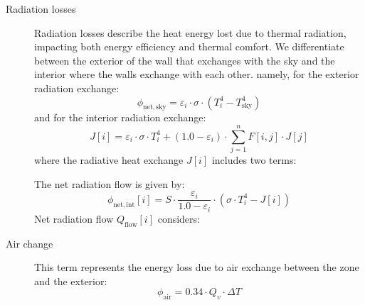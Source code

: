 \documentclass[runningheads]{llncs}
\begin{document}
\begin{description}
\item[Radiation losses] Radiation losses describe the heat energy lost due to thermal radiation, impacting both energy efficiency and thermal comfort.
We differentiate between the exterior of the wall that exchanges with the sky and the interior where the walls exchange with each other.
namely, for the exterior radiation exchange:
\begin{equation}
  \phi_{\mathrm{net,sky}} = \varepsilon_i \cdot \sigma \cdot \left( T_i^4 - T_{\mathrm{sky}}^4 \right)
\end{equation}
and for the interior radiation exchange:
\begin{equation}
  J[i] = \varepsilon_i \cdot \sigma \cdot T_i^4 + \left( 1.0 - \varepsilon_i \right) \cdot \sum_{j=1}^{n} F[i,j] \cdot J[j]
\end{equation}
where the radiative heat exchange $J[i]$ includes two terms:
The net radiation flow is given by:
\begin{equation}
  \phi_{\mathrm{net,int}}[i] = S \cdot \dfrac{\varepsilon_i}{1.0 - \varepsilon_i} \cdot \left( \sigma \cdot T_i^4 - J[i] \right)
\end{equation}
Net radiation flow $Q_{\mathrm{flow}}[i]$ considers:

\item[Air change] This term represents the energy loss due to air exchange between the zone and the exterior:
\begin{equation}
  \phi_{\mathrm{air}} = 0.34 \cdot Q_v \cdot \Delta T
\end{equation}
\end{description}
\end{document}
